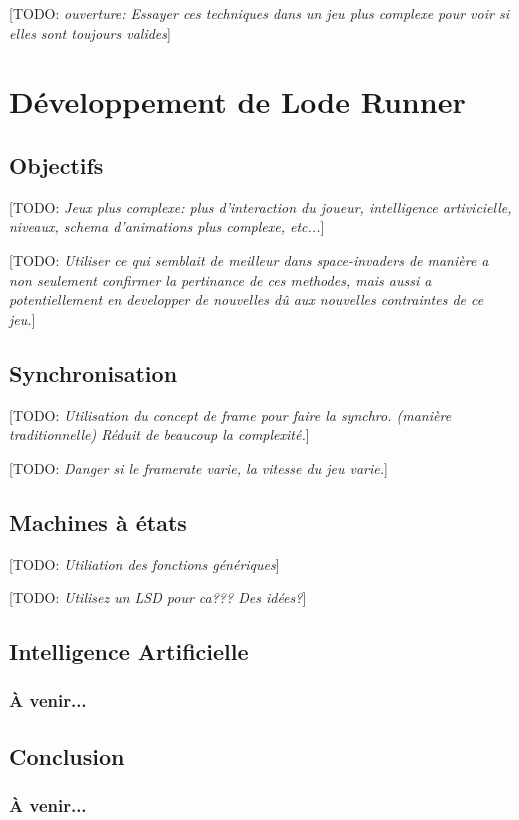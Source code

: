 \documentclass[12pt,oneside,letterpaper,francais]{book}
\newcommand{\todo}[1]{[TODO: {\it #1}]}
\begin{document}
\todo{ouverture: Essayer ces techniques dans un jeu plus complexe pour
  voir si elles sont toujours valides}


\section{Développement de \og Lode Runner \fg}
\subsection{Objectifs}
\todo{Jeux plus complexe: plus d'interaction du joueur, intelligence
  artivicielle, niveaux, schema d'animations plus complexe, etc...}

\todo{Utiliser ce qui semblait de meilleur dans space-invaders de
  manière a non seulement confirmer la pertinance de ces methodes,
  mais aussi a potentiellement en developper de nouvelles dû aux
  nouvelles contraintes de ce jeu.}

\subsection{Synchronisation}
\todo{Utilisation du concept de frame pour faire la synchro. (manière
  traditionnelle) Réduit de beaucoup la complexité.}

\todo{Danger si le framerate varie, la vitesse du jeu varie.}

\subsection{Machines à états}
\todo{Utiliation des fonctions génériques}

\todo{Utilisez un LSD pour ca??? Des idées?}

\subsection{Intelligence Artificielle}
\subsubsection{À venir...}

\subsection{Conclusion}
\subsubsection{À venir...}
\end{document}

